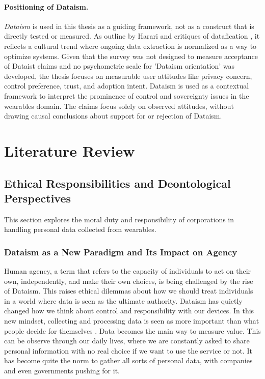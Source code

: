 \paragraph{Positioning of Dataism.} \textit{Dataism} is used in this thesis as a guiding framework, not as a construct that is directly tested or measured. As outline by Harari \cite{Harari2017} and critiques of datafication \cite{VanDijck2014}, it reflects a cultural trend where ongoing data extraction is normalized as a way to optimize systems. Given that the survey was not designed to measure acceptance of Dataist claims and no psychometric scale for 'Dataism orientation' was developed, the thesis focuses on measurable user attitudes like privacy concern, control preference, trust, and adoption intent. Dataism is used as a contextual framework to interpret the prominence of control and sovereignty issues in the wearables domain. The claims focus solely on observed attitudes, without drawing causal conclusions about support for or rejection of Dataism.

\section{Literature Review}
\subsection{Ethical Responsibilities and Deontological Perspectives}
This section explores the moral duty and responsibility of corporations in handling personal data collected from wearables.
	\subsubsection{Dataism as a New Paradigm and Its Impact on Agency}

	Human agency, a term that refers to the capacity of individuals to act on their own, independently, and make their own choices, is being challenged by the rise of Dataism. This raises ethical dilemmas about how we should treat individuals in a world where data is seen as the ultimate authority.
	Dataism has quietly changed how we think about control and responsibility with our devices. 
	In this new mindset, collecting and processing data is seen as more important than what people decide for themselves \cite{Harari2017}. Data becomes the main way to measure value. This can be observe through our daily lives, where we are constantly asked to share personal information with no real choice if we want to use the service or not. It has become quite the norm to gather all sorts of personal data, with companies and even governments pushing for it.

